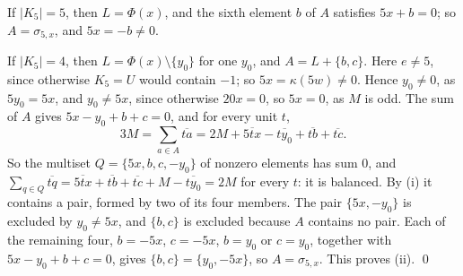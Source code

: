 If $|K_{5}|=5$, then $L=\Phi(x)$, and the sixth element $b$ of $A$ satisfies
$5x+b=0$; so $A=\sigma_{5,x}$, and $5x=-b\ne0$.

If $|K_{5}|=4$, then $L=\Phi(x)\setminus\{y_{0}\}$ for one $y_{0}$, and
$A=L+\{b,c\}$. Here $e\ne5$, since otherwise $K_{5}=U$ would contain $-1$;
so $5x=\kappa(5w)\ne0$. Hence $y_{0}\ne0$, as $5y_{0}=5x$, and $y_{0}\ne5x$,
since otherwise $20x=0$, so $5x=0$, as $M$ is odd. The sum of $A$ gives
$5x-y_{0}+b+c=0$, and for every unit $t$,
\[
  3M=\sum_{a\in A}\overline{ta}=2M+\overline{5tx}-\overline{ty_{0}}
  +\overline{tb}+\overline{tc}.
\]
So the multiset $Q=\{5x,b,c,-y_{0}\}$ of nonzero elements has sum $0$, and
$\sum_{q\in Q}\overline{tq}=\overline{5tx}+\overline{tb}+\overline{tc}+M
-\overline{ty_{0}}=2M$ for every $t$: it is balanced. By (i) it contains a
pair, formed by two of its four members. The pair $\{5x,-y_{0}\}$ is
excluded by $y_{0}\ne5x$, and $\{b,c\}$ is excluded because $A$ contains no
pair. Each of the remaining four, $b=-5x$, $c=-5x$, $b=y_{0}$ or $c=y_{0}$,
together with $5x-y_{0}+b+c=0$, gives $\{b,c\}=\{y_{0},-5x\}$, so
$A=\sigma_{5,x}$. This proves (ii).
\qed
